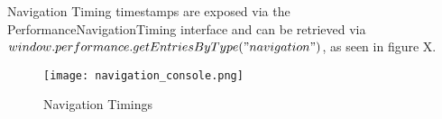 
Navigation Timing timestamps are exposed via the PerformanceNavigationTiming interface and can be retrieved via $window.performance.getEntriesByType("navigation")$, as seen in figure X. %







\begin{figure}[h!]
\begin{center}
\texttt{[image: navigation\_console.png]}
\caption{Navigation Timings}
\label{img:navigation_console}
\end{center}
\end{figure}





